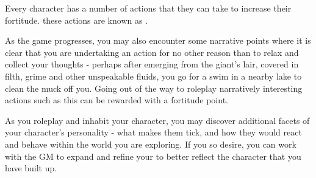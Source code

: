 Every character has a number of actions that they can take to increase their fortitude. these actions are known as .

\begin{itemize}
\end{itemize}

As the game progresses, you may also encounter some narrative points where it is clear that you are undertaking an action for no other reason than to relax and collect your thoughts - perhaps after emerging from the giant's lair, covered in filth, grime and other unspeakable fluids, you go for a swim in a nearby lake to clean the muck off you. Going out of the way to roleplay narratively interesting actions such as this can be rewarded with a fortitude point. 

As you roleplay and inhabit your character, you may discover additional facets of your character's personality - what makes them tick, and how they would react and behave within the world you are exploring. If you so desire, you can work with the GM to expand and refine your  to better reflect the character that you have built up. 

